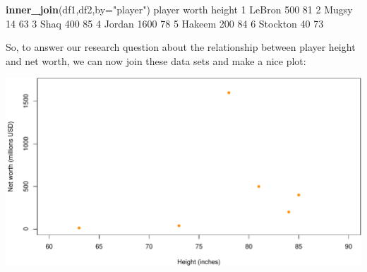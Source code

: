 \documentclass[]{book}
\newenvironment{Shaded}{\begin{snugshade}}{\end{snugshade}}
\newcommand{\DataTypeTok}[1]{\textcolor[rgb]{0.13,0.29,0.53}{#1}}
\newcommand{\DecValTok}[1]{\textcolor[rgb]{0.00,0.00,0.81}{#1}}
\newcommand{\KeywordTok}[1]{\textcolor[rgb]{0.13,0.29,0.53}{\textbf{#1}}}
\newcommand{\NormalTok}[1]{#1}
\newcommand{\OperatorTok}[1]{\textcolor[rgb]{0.81,0.36,0.00}{\textbf{#1}}}
\newcommand{\StringTok}[1]{\textcolor[rgb]{0.31,0.60,0.02}{#1}}
\begin{document}
\begin{Shaded}
\begin{Highlighting}[]
\KeywordTok{inner_join}\NormalTok{(df1,df2,}\DataTypeTok{by=}\StringTok{"player"}\NormalTok{)}
\NormalTok{    player worth height}
\DecValTok{1}\NormalTok{   LeBron   }\DecValTok{500}     \DecValTok{81}
\DecValTok{2}\NormalTok{    Mugsy    }\DecValTok{14}     \DecValTok{63}
\DecValTok{3}\NormalTok{     Shaq   }\DecValTok{400}     \DecValTok{85}
\DecValTok{4}\NormalTok{   Jordan  }\DecValTok{1600}     \DecValTok{78}
\DecValTok{5}\NormalTok{   Hakeem   }\DecValTok{200}     \DecValTok{84}
\DecValTok{6}\NormalTok{ Stockton    }\DecValTok{40}     \DecValTok{73}
\end{Highlighting}
\end{Shaded}

So, to answer our research question about the relationship between player height and net worth, we can now join these data sets and make a nice plot:

\begin{Shaded}
\end{Shaded}

\includegraphics{figures/unnamed-chunk-454-1.pdf}
\end{document}
